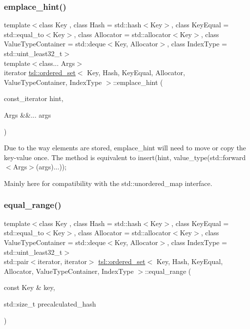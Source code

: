 \subsubsection{\texorpdfstring{emplace\_hint()}{emplace\_hint()}}
{\footnotesize\ttfamily template$<$class Key , class Hash  = std\+::hash$<$\+Key$>$, class Key\+Equal  = std\+::equal\+\_\+to$<$\+Key$>$, class Allocator  = std\+::allocator$<$\+Key$>$, class Value\+Type\+Container  = std\+::deque$<$\+Key, Allocator$>$, class Index\+Type  = std\+::uint\+\_\+least32\+\_\+t$>$ \\
template$<$class... Args$>$ \\
iterator \mbox{\hyperlink{classtsl_1_1ordered__set}{tsl\+::ordered\+\_\+set}}$<$ Key, Hash, Key\+Equal, Allocator, Value\+Type\+Container, Index\+Type $>$\+::emplace\+\_\+hint (\begin{DoxyParamCaption}\item[{const\+\_\+iterator}]{hint,  }\item[{Args \&\&...}]{args }\end{DoxyParamCaption})\hspace{0.3cm}{\ttfamily [inline]}}

Due to the way elements are stored, emplace\+\_\+hint will need to move or copy the key-\/value once. The method is equivalent to insert(hint, value\+\_\+type(std\+::forward$<$\+Args$>$(args)...));

Mainly here for compatibility with the std\+::unordered\+\_\+map interface. \mbox{\label{classtsl_1_1ordered__set_a75a3625f26abb12ef09c41e18a12bbef}} 
\subsubsection{\texorpdfstring{equal\_range()}{equal\_range()}\hspace{0.1cm}{\footnotesize\ttfamily [1/6]}}
{\footnotesize\ttfamily template$<$class Key , class Hash  = std\+::hash$<$\+Key$>$, class Key\+Equal  = std\+::equal\+\_\+to$<$\+Key$>$, class Allocator  = std\+::allocator$<$\+Key$>$, class Value\+Type\+Container  = std\+::deque$<$\+Key, Allocator$>$, class Index\+Type  = std\+::uint\+\_\+least32\+\_\+t$>$ \\
std\+::pair$<$iterator, iterator$>$ \mbox{\hyperlink{classtsl_1_1ordered__set}{tsl\+::ordered\+\_\+set}}$<$ Key, Hash, Key\+Equal, Allocator, Value\+Type\+Container, Index\+Type $>$\+::equal\+\_\+range (\begin{DoxyParamCaption}\item[{const Key \&}]{key,  }\item[{std\+::size\+\_\+t}]{precalculated\+\_\+hash }\end{DoxyParamCaption})\hspace{0.3cm}{\ttfamily [inline]}}

